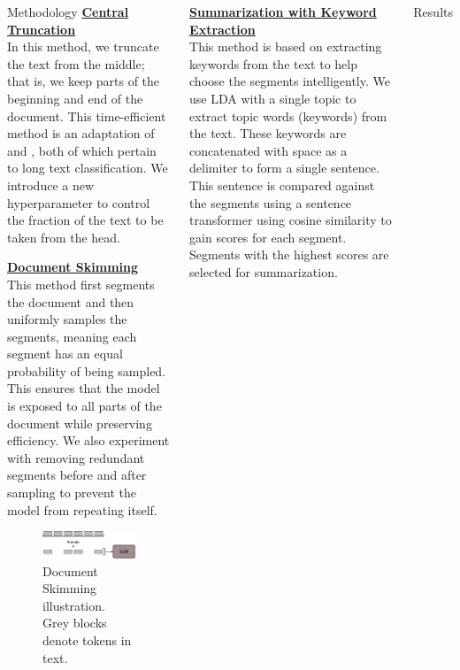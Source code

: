 \documentclass[20pt]{beamer}
\newcommand{\heading}[1]{\ul{\textbf{#1}} \\}
\begin{document}
\begin{frame}[t]
\begin{columns}[t]
  \begin{block}{Methodology}
    \heading{Central Truncation}
    In this method, we truncate the text from the middle; that is, we keep parts of the beginning and end of the document.
    This time-efficient method is an adaptation of \cite{worsham-kalita-2018-genre} and \cite{sun2019fine}, both of which pertain to long text classification.
    We introduce a new hyperparameter to control the fraction of the text to be taken from the head.

    \heading{Document Skimming}
    This method first segments the document and then uniformly samples the segments, meaning each segment has an equal probability of being sampled.
    This ensures that the model is exposed to all parts of the document while preserving efficiency.
    We also experiment with removing redundant segments before and after sampling to prevent the model from repeating itself.
    \begin{figure}[!h]
      \centering
      \includegraphics[width=\textwidth]{images/doc-skim.png}
      \caption{Document Skimming illustration. Grey blocks denote tokens in text.}
    \end{figure}
  \end{block}


  \vspace{.8cm}
  \begin{minipage}{\columnwidth}
    \heading{Summarization with Keyword Extraction}
    This method is based on extracting keywords from the text to help choose the segments intelligently.
    We use LDA \cite{blei2003latent} with a single topic to extract topic words (keywords) from the text.
    These keywords are concatenated with space as a delimiter to form a single sentence.
    This sentence is compared against the segments using a sentence transformer using cosine similarity to gain scores for each segment.
    Segments with the highest scores are selected for summarization.
  \end{minipage}
  
  \begin{block}{Results}
    \begin{table}[!ht]
      \centering
      \small
    

\end{table}
\end{block}
\end{columns}
\end{frame}
\end{document}
